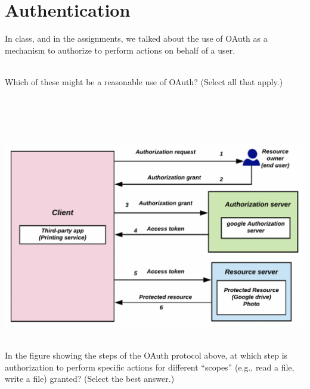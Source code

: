 \section*{Authentication}

In class, and in the assignments, we talked about the use of OAuth as a
mechanism to authorize to perform actions on behalf of a user.


 \\
Which of these might be a reasonable use of OAuth? (Select all that apply.)\\
 \\
\\
\\
\\
\eprob

\begin{center}
\includegraphics[width=0.75\linewidth]{oauth}
\end{center}

 \\ In the figure showing the steps of the OAuth protocol above, at which step is
authorization to perform specific actions for different ``scopes'' (e.g., read
a file, write a file) granted? (Select the best answer.) \\
\\
\\
\\
\\
\eprob

